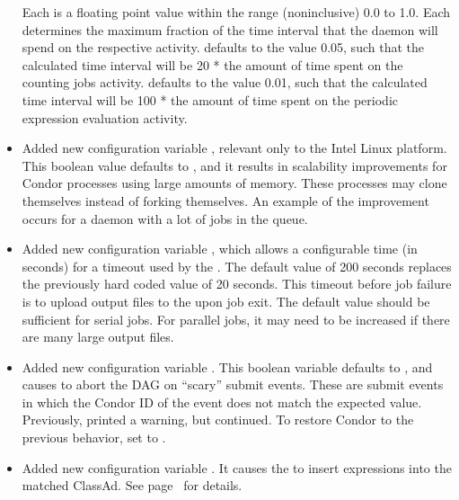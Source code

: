 \begin{itemize}
  Each is a floating point value within the range
  (noninclusive) 0.0 to 1.0.
  Each determines the maximum fraction of the time interval that the 
   daemon  will spend on the respective
  activity.
   defaults to the value 0.05,
  such that the calculated time interval will be 20 * the amount
  of time spent on the counting jobs activity.
   defaults to the value 0.01,
  such that the calculated time interval will be 100 * the amount
  of time spent on the periodic expression evaluation activity.

\item Added new configuration variable 
  , relevant only to the
  Intel Linux platform.  
  This boolean value defaults to , and it results in scalability
  improvements for Condor processes using large amounts of memory.
  These processes may clone themselves instead of forking themselves.
  An example of the improvement occurs for a 
  daemon with a lot of jobs in the queue.

\item Added new configuration variable ,
  which allows a configurable time (in seconds) for a timeout used by the 
  .
  The default value of 200 seconds replaces the previously hard coded
  value of 20 seconds.
  This timeout before job failure is to upload output files to the
   upon job exit.
  The default value should be sufficient for serial jobs.
  For parallel jobs, it may need to
  be increased if there are many large output files.

\item Added new configuration variable .
  This boolean variable defaults to , and causes
   to abort the DAG on ``scary'' submit events.
  These are submit events in which
  the Condor ID of the event does not match the expected value.
  Previously,  printed a warning, but continued.
  To restore Condor to the previous behavior,
  set  to .

\item Added new configuration variable .
  It causes the  to
  insert expressions into the matched ClassAd.  See
  page~\pageref{param:NegotiatorMatchExprs} for details.


\end{itemize}
